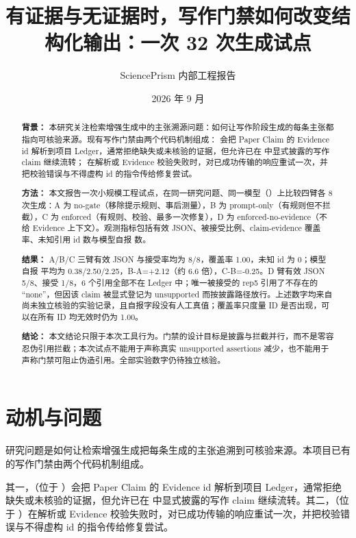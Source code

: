 \documentclass[UTF8]{ctexart}
\title{有证据与无证据时，写作门禁如何改变结构化输出：一次 32 次生成试点}
\author{SciencePrism 内部工程报告}
\date{2026 年 9 月}
\begin{document}
\maketitle

\begin{abstract}
\noindent\textbf{背景：} 本研究关注检索增强生成中的主张溯源问题：如何让写作阶段生成的每条主张都指向可核验来源。现有写作门禁由两个代码机制组成： 会把 Paper Claim 的 Evidence id 解析到项目 Ledger，通常拒绝缺失或未核验的证据，但允许已在  中显式披露的写作 claim 继续流转； 在解析或 Evidence 校验失败时，对已成功传输的响应重试一次，并把校验错误与不得虚构 id 的指令传给修复尝试。

\noindent\textbf{方法：} 本文报告一次小规模工程试点，在同一研究问题、同一模型（）上比较四臂各 8 次生成：A 为 no-gate（移除提示规则、事后测量），B 为 prompt-only（有规则但不拦截），C 为 enforced（有规则、校验、最多一次修复），D 为 enforced-no-evidence（不给 Evidence 上下文）。观测指标包括有效 JSON、被接受比例、claim-evidence 覆盖率、未知引用 id 数与模型自报  数。

\noindent\textbf{结果：} A/B/C 三臂有效 JSON 与接受率均为 8/8，覆盖率 1.00，未知 id 为 0；模型自报  平均为 0.38/2.50/2.25，B-A=+2.12（约 6.6 倍），C-B=-0.25。D 臂有效 JSON 5/8、接受 1/8，6 个引用全部不在 Ledger 中；唯一被接受的 rep5 引用了不存在的 ``none''，但因该 claim 被显式登记为 unsupported 而按披露路径放行。上述数字均来自尚未独立核验的实验记录，且自报字段没有人工真值；覆盖率只度量 ID 是否出现，可以在所有 ID 均无效时仍为 1.00。

\noindent\textbf{结论：} 本文结论只限于本次工具行为。门禁的设计目标是披露与拦截并行，而不是零容忍伪引用拦截；本次试点不能用于声称真实 unsupported assertions 减少，也不能用于声称门禁可阻止伪造引用。全部实验数字仍待独立核验。
\end{abstract}

\section{动机与问题}

研究问题是如何让检索增强生成把每条生成的主张追溯到可核验来源。本项目已有的写作门禁由两个代码机制组成。

其一，（位于 ）会把 Paper Claim 的 Evidence id 解析到项目 Ledger，通常拒绝缺失或未核验的证据，但允许已在  中显式披露的写作 claim 继续流转。其二，（位于 ）在解析或 Evidence 校验失败时，对已成功传输的响应重试一次，并把校验错误与不得虚构 id 的指令传给修复尝试。
\end{document}
